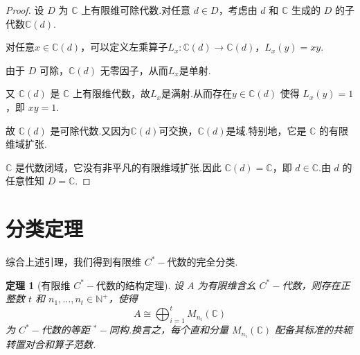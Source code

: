 \documentclass[math-font=lm, text-font=lm, math-style=TeX]{sjtureport}
\newtheorem{theorem}{定理}[chapter]
\theoremstyle{plain}
\newtheorem*{proof}{证明}
\theoremstyle{plain}
\begin{document}
\begin{proof}
    设 $D$ 为 $\mathbb{C}$ 上有限维可除代数.对任意 $d \in D$，考虑由 $d$ 和 $\mathbb{C}$ 生成的 $D$ 的子代数$\mathbb{C}(d)$.\par
    对任意$x\in \mathbb{C}(d)$，可以定义左乘算子$L_x:\mathbb{C}(d) \to \mathbb{C}(d)$，$L_x(y) = xy$.\par
    由于 $D$ 可除，$\mathbb{C}(d)$ 无零因子，从而$L_x$是单射.\par
    又 $\mathbb{C}(d)$ 是 $\mathbb{C}$ 上有限维代数，故$L_x$是满射.从而存在$y\in\mathbb{C}(d)$ 使得 $L_x(y) = 1$，即 $xy = 1$.\par
    故 $\mathbb{C}(d)$ 是可除代数.又因为$\mathbb{C}(d)$可交换，$\mathbb{C}(d)$是域.特别地，它是 $\mathbb{C}$ 的有限维域扩张.\par
    $\mathbb{C}$ 是代数闭域，它没有非平凡的有限维域扩张.因此 $\mathbb{C}(d) = \mathbb{C}$，即 $d \in \mathbb{C}$.由 $d$ 的任意性知 $D = \mathbb{C}$.
\end{proof}

\section{分类定理}

综合上述引理，我们得到有限维 $C^*-\!$代数的完全分类.

\begin{theorem}[有限维 $C^*-\!$代数的结构定理]\label{thm:fd-cstar}
    设 $A$ 为有限维含幺 $C^*-\!$代数，则存在正整数 $t$ 和 $n_1, \dots, n_t \in \mathbb{N}^+$，使得
    \begin{equation}\label{eq:fd-cstar-classification}
        A \cong \bigoplus_{i=1}^t M_{n_i}(\mathbb{C})
    \end{equation}
    为 $C^*-\!$代数的等距 ${}^*-\!$同构.换言之，每个直和分量 $M_{n_i}(\mathbb{C})$ 配备其标准的共轭转置对合和算子范数.
\end{theorem}
\end{document}
